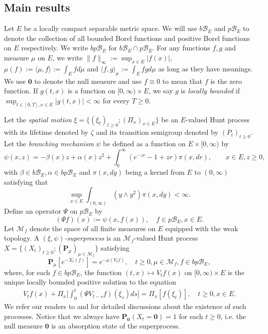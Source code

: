 \documentclass[UTF8]{pkuthss}
\theoremstyle{plain}
\theoremstyle{definition}
\numberwithin{equation}{section}
\begin{document}
\subsection{Main results}	
\label{sec: Main results}
	Let $E$ be a locally compact separable metric space.
	We will use $b\mathscr B_E$ and $p\mathscr B_E$ to denote the collection of all bounded Borel functions and positive Borel functions on $E$ respectively.
	We write $bp\mathscr B_E$ for $b\mathscr B_E \cap p\mathscr B_E$.
	For any functions $f,g$ and measure $\mu$ on $E$, we write $\|f\|_\infty := \sup_{x\in E} |f(x)|$, $\mu(f) :=\langle \mu,f \rangle:= \int_E f d\mu$ and $\langle f,g \rangle_\mu := \int_E fg d\mu$ as long as they have meanings.
	We use $\mathbf 0$ to denote the null measure and use $f\equiv 0$ to mean that $f$ is the zero function.
	If $g(t,x)$ is a function on $[0,\infty)\times E$, we say $g$ is \emph{locally bounded} if $\sup_{t\in [0,T],x\in E} |g(t,x)|<\infty$ for every $T\geq 0$.

	Let the \emph{spatial motion} $\xi=\{(\xi_t)_{t\geq 0};(\Pi_x)_{x\in E}\}$ be an $E$-valued Hunt process with its lifetime denoted by $\zeta$ and its transition semigroup denoted by $(P_t)_{t\geq 0}$.
	Let the \emph{branching mechanism} $\psi$ be defined as a function on $E\times[0,\infty)$ by
\[
 	\psi(x,z) 
 	= -\beta(x)z + \alpha(x)z^2+\int_0^\infty (e^{-zr}-1+zr )\pi(x, dr),
 	\qquad x\in E, z\geq0,
\]
	with $\beta\in b\mathscr B_E,\alpha\in bp\mathscr B_E$ and $\pi(x,dy)$ being a kernel from $E$ to $(0,\infty)$ satisfying that \[\sup_{x\in E} \int_{(0,\infty)} (y\wedge y^2) \pi(x,dy) < \infty.\]
	Define an operator $\Psi$ on $p\mathscr B_E$ by
\[
	(\Psi f) (x)
	:= \psi(x,f(x)),
	\quad f\in p\mathscr B_E, x\in E.
\]
	Let $\mathcal M_f$ denote the space of all finite measures on $E$ equipped with the weak topology.
	A \emph{$(\xi,\psi)$-superprocess} is an $\mathcal M_f$-valued Hunt process $X=\{(X_t)_{t\geq 0}; (\mathbf P_\mu)_{\mu \in \mathcal M_f}\}$ satisfying
\begin{equation}
\label{eq: Defi of Vt}
 	\mathbf P_\mu [e^{-X_t(f)}] = e^{-\mu(V_tf)},
 	\quad t\geq 0, \mu \in \mathcal M_f, f\in bp\mathscr B_E,
\end{equation}
  where, for each $f\in bp\mathscr B_E$, the function $(t,x) \mapsto V_tf(x)$ on $[0,\infty) \times E$ is the unique locally bounded positive solution to the equation
\begin{align}\label{eq: chap 3 FKPP_in_definition}
  	V_t f(x) + \Pi_x \Big[ \int_0^t (\Psi V_{t-s} f)(\xi_s) ds \Big]
	=\Pi_x[f(\xi_t)], \quad t \geq 0, x\in E.
\end{align}
	We refer our readers to \cite{Dawson1993Measure-valued, Dynkin1993Superprocesses}
	and \cite[Section 2.3 \& Theorem 5.11]{Li2011Measure-valued}
	for detailed discussions about the existence of such processes.
	Notice that we always have $\mathbf P_{\mathbf 0}(X_t = \mathbf 0) = 1$ for each $t\geq 0$, i.e. the null measure $\mathbf 0$ is an absorption state of the superprocess.
\end{document}
